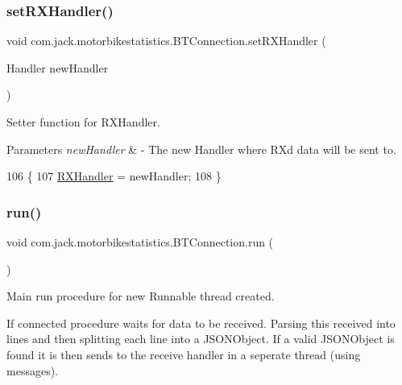 \subsubsection{\texorpdfstring{set\+R\+X\+Handler()}{setRXHandler()}}
{\footnotesize\ttfamily void com.\+jack.\+motorbikestatistics.\+B\+T\+Connection.\+set\+R\+X\+Handler (\begin{DoxyParamCaption}\item[{Handler}]{new\+Handler }\end{DoxyParamCaption})\hspace{0.3cm}{\ttfamily [inline]}}



Setter function for R\+X\+Handler. 


\begin{DoxyParams}{Parameters}
{\em new\+Handler} & -\/ The new Handler where RX\textquotesingle{}d data will be sent to. \\
\hline
\end{DoxyParams}

\begin{DoxyCode}
106                                                  \{
107         \hyperlink{classcom_1_1jack_1_1motorbikestatistics_1_1_b_t_connection_a64fc7b02a2b9f052c6b05842b79b3cdc}{RXHandler} = newHandler;
108     \}
\end{DoxyCode}
\mbox{\label{classcom_1_1jack_1_1motorbikestatistics_1_1_b_t_connection_ae4c6a0897742c6a7ccfb0b43d0d987da}} 
\subsubsection{\texorpdfstring{run()}{run()}}
{\footnotesize\ttfamily void com.\+jack.\+motorbikestatistics.\+B\+T\+Connection.\+run (\begin{DoxyParamCaption}{ }\end{DoxyParamCaption})\hspace{0.3cm}{\ttfamily [inline]}}



Main run procedure for new Runnable thread created. 

If connected procedure waits for data to be received. Parsing this received into lines and then splitting each line into a J\+S\+O\+N\+Object. If a valid J\+S\+O\+N\+Object is found it is then sends to the receive handler in a seperate thread (using messages). 

